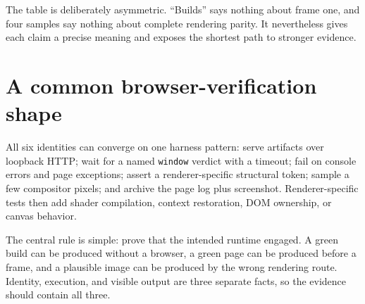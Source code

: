 The table is deliberately asymmetric.  ``Builds'' says nothing about frame one, and four
samples say nothing about complete rendering parity.  It nevertheless gives each claim a
precise meaning and exposes the shortest path to stronger evidence.

\section{A common browser-verification shape}

All six identities can converge on one harness pattern: serve artifacts over loopback HTTP;
wait for a named \texttt{window} verdict with a timeout; fail on console errors and page
exceptions; assert a renderer-specific structural token; sample a few compositor pixels; and
archive the page log plus screenshot.  Renderer-specific tests then add shader compilation,
context restoration, DOM ownership, or canvas behavior.

The central rule is simple: prove that the intended runtime engaged.  A green build can be
produced without a browser, a green page can be produced before a frame, and a plausible image
can be produced by the wrong rendering route.  Identity, execution, and visible output are
three separate facts, so the evidence should contain all three.
